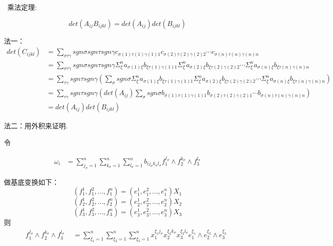 \documentclass{amsc}          %
\numberwithin{equation}{section} %
\begin{document}
\begin{theorem}\   乘法定理:

    $$det(A_{ij}B_{ijkl})=det(A_{ij})det(B_{ijkl})$$
\end{theorem}

\begin{prof}

法一：
\begin{align*}
det(C_{ijkl})&=\sum \limits_{\sigma\tau\gamma}sgn\sigma sgn\tau sgn\gamma c_{\sigma(1)\tau(1)\gamma(1)1} c_{\sigma(2)\tau(2)\gamma(2)2}\cdots c_{\sigma(n)\tau(n)\gamma(n)n}\\
&=\sum \limits_{\sigma\tau\gamma}sgn\sigma sgn\tau sgn\gamma \Sigma_{\xi}^{n}a_{\sigma(1)\xi}b_{\xi \tau(1)\gamma(1)1} \Sigma_{\xi}^{n}a_{\sigma(2)\xi}b_{\xi \tau(2)\gamma(2)2}\cdots \Sigma_{\xi}^{n}a_{\sigma(n)\xi}b_{\xi \tau(n)\gamma(n)n}\\
&=\sum \limits_{\tau\gamma}sgn\tau sgn\gamma(\sum \limits_{\sigma}sgn\sigma  \Sigma_{\xi}^{n}a_{\sigma(1)\xi}b_{\xi \tau(1)\gamma(1)1} \Sigma_{\xi}^{n}a_{\sigma(2)\xi}b_{\xi \tau(2)\gamma(2)2}\cdots \Sigma_{\xi}^{n}a_{\sigma(n)\xi}b_{\xi \tau(n)\gamma(n)n})\\
&=\sum \limits_{\tau\gamma}sgn\tau sgn\gamma(det(A_{ij})\sum \limits_{\sigma}sgn\sigma b_{\sigma(1) \tau(1)\gamma(1)1} b_{\sigma(2) \tau(2)\gamma(2)1} \cdots b_{\sigma(n) \tau(n)\gamma(n)n})\\
&=det(A_{ij})det(B_{ijkl})
\end{align*}

法二：用外积来证明.

令

\begin{equation}
\begin{aligned}
\omega_{i}
&= \sum_{j_{\sigma}=1}^{n}\sum_{k_{\sigma}=1}^{n}\sum_{l_{\sigma}=1}^{n}b_{ij_{\sigma}k_{\sigma}l_{\sigma}} f_{1}^{j_{\sigma}} \wedge f_{2}^{k_{\sigma}} \wedge f_{3}^{l_{\sigma}}
\end{aligned}
\end{equation}

做基底变换如下：
$$(f_{1}^{1},f_{1}^{2},...,f_{1}^{n})=(e_{1}^{1},e_{1}^{2},...,e_{1}^{n})X_{1}$$
$$(f_{2}^{1},f_{2}^{2},...,f_{2}^{n})=(e_{2}^{1},e_{2}^{2},...,e_{2}^{n})X_{2}$$
$$(f_{3}^{1},f_{3}^{2},...,f_{3}^{n})=(e_{3}^{1},e_{3}^{2},...,e_{3}^{n})X_{3}$$
则
\begin{equation}
f_{1}^{j_{\sigma}}\wedge f_{2}^{k_{\sigma}}\wedge f_{3}^{l_{\sigma}}
\begin{aligned}
& = \sum_{\xi_{1}=1}^{n}\sum_{\xi_{2}=1}^{n}\sum_{\xi_{3}=1}^{n}x_{1}^{\xi_{1}j_{\sigma}}x_{2}^{\xi_{2}k_{\sigma}}x_{3}^{\xi_{
3}l_{\sigma}}e_{1}^{\xi_{1}}\wedge e_{2}^{\xi_{2}}\wedge e_{3}^{\xi_{3}}
\end{aligned}
\end{equation}


\end{prof}
\end{document}
